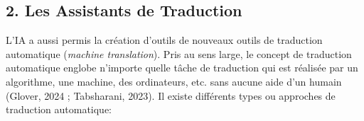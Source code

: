 \documentclass[
  letterpaper,
  DIV=11,
  numbers=noendperiod]{scrreprt}
\newenvironment{Shaded}{\begin{snugshade}}{\end{snugshade}}
\newcommand{\AttributeTok}[1]{\textcolor[rgb]{0.40,0.45,0.13}{#1}}
\newcommand{\CommentTok}[1]{\textcolor[rgb]{0.37,0.37,0.37}{#1}}
\newcommand{\FunctionTok}[1]{\textcolor[rgb]{0.28,0.35,0.67}{#1}}
\newcommand{\NormalTok}[1]{\textcolor[rgb]{0.00,0.23,0.31}{#1}}
\newcommand{\OtherTok}[1]{\textcolor[rgb]{0.00,0.23,0.31}{#1}}
\newcommand{\SpecialCharTok}[1]{\textcolor[rgb]{0.37,0.37,0.37}{#1}}
\newcommand{\StringTok}[1]{\textcolor[rgb]{0.13,0.47,0.30}{#1}}
\begin{document}
\begin{Shaded}
\end{Shaded}

\subsection{2. Les Assistants de
Traduction}\label{les-assistants-de-traduction}

L'IA a aussi permis la création d'outils de nouveaux outils de
traduction automatique (\emph{machine translation}). Pris au sens large,
le concept de traduction automatique englobe n'importe quelle tâche de
traduction qui est réalisée par un algorithme, une machine, des
ordinateurs, etc. sans aucune aide d'un humain (Glover, 2024 ;
Tabsharani, 2023). Il existe différents types ou approches de traduction
automatique:
\end{document}
